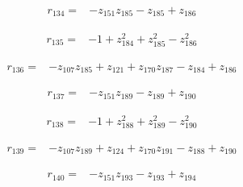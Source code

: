 \par\noindent\begin{minipage}{\linewidth}
\begin{align*}
r_{134}={}&-z_{151}z_{185}-z_{185}+z_{186}
\end{align*}
\end{minipage}\par
\par\noindent\begin{minipage}{\linewidth}
\begin{align*}
r_{135}={}&-1+z_{184}^{2}+z_{185}^{2}-z_{186}^{2}
\end{align*}
\end{minipage}\par
\par\noindent\begin{minipage}{\linewidth}
\begin{align*}
r_{136}={}&-z_{107}z_{185}+z_{121}+z_{170}z_{187}-z_{184}+z_{186}
\end{align*}
\end{minipage}\par
\par\noindent\begin{minipage}{\linewidth}
\begin{align*}
r_{137}={}&-z_{151}z_{189}-z_{189}+z_{190}
\end{align*}
\end{minipage}\par
\par\noindent\begin{minipage}{\linewidth}
\begin{align*}
r_{138}={}&-1+z_{188}^{2}+z_{189}^{2}-z_{190}^{2}
\end{align*}
\end{minipage}\par
\par\noindent\begin{minipage}{\linewidth}
\begin{align*}
r_{139}={}&-z_{107}z_{189}+z_{124}+z_{170}z_{191}-z_{188}+z_{190}
\end{align*}
\end{minipage}\par
\par\noindent\begin{minipage}{\linewidth}
\begin{align*}
r_{140}={}&-z_{151}z_{193}-z_{193}+z_{194}
\end{align*}
\end{minipage}\par
